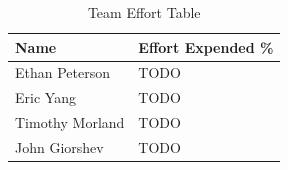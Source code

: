 \documentclass[letterpaper,11pt]{article}
\begin{document}

\begin{table}[H]
  \caption{Team Effort Table}
  \centering
  \begin{tabularx}{10cm}{l|l}
    \textbf{Name} & \textbf{Effort Expended \%}\\
    \hline
    Ethan Peterson & TODO \\
    \hline
    Eric Yang & TODO \\
    \hline
    Timothy Morland & TODO \\
    \hline
    John Giorshev & TODO \\
  \end{tabularx} 
\end{table}
\newpage




\newpage
{}

\pagestyle{empty}
\end{document}
